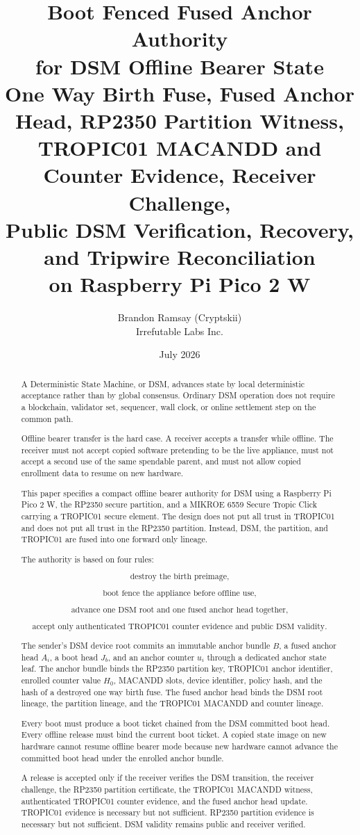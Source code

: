 \documentclass[11pt]{article}
\title{\textbf{Boot Fenced Fused Anchor Authority\\
for DSM Offline Bearer State}\\[4pt]
\large One Way Birth Fuse, Fused Anchor Head, RP2350 Partition Witness,\\
TROPIC01 MACANDD and Counter Evidence, Receiver Challenge,\\
Public DSM Verification, Recovery, and Tripwire Reconciliation\\
on Raspberry Pi Pico 2 W}
\author{Brandon Ramsay (Cryptskii)\\\small Irrefutable Labs Inc.}
\date{July 2026}
\theoremstyle{definition}
\theoremstyle{remark}
\newcommand{\Bundle}{\ensuremath{B}}
\newcommand{\Ahead}{\ensuremath{A}}
\newcommand{\Bhead}{\ensuremath{J}}
\begin{document}
\maketitle

\begin{abstract}
A Deterministic State Machine, or DSM, advances state by local deterministic acceptance rather
than by global consensus. Ordinary DSM operation does not require a blockchain, validator set,
sequencer, wall clock, or online settlement step on the common path.

Offline bearer transfer is the hard case. A receiver accepts a transfer while offline. The receiver
must not accept copied software pretending to be the live appliance, must not accept a second use
of the same spendable parent, and must not allow copied enrollment data to resume on new hardware.

This paper specifies a compact offline bearer authority for DSM using a Raspberry Pi Pico 2 W,
the RP2350 secure partition, and a MIKROE 6559 Secure Tropic Click carrying a TROPIC01 secure
element. The design does not put all trust in TROPIC01 and does not put all trust in the RP2350
partition. Instead, DSM, the partition, and TROPIC01 are fused into one forward only lineage.

The authority is based on four rules:

\[
\text{destroy the birth preimage,}
\]

\[
\text{boot fence the appliance before offline use,}
\]

\[
\text{advance one DSM root and one fused anchor head together,}
\]

\[
\text{accept only authenticated TROPIC01 counter evidence and public DSM validity.}
\]

The sender's DSM device root commits an immutable anchor bundle \(\Bundle\), a fused anchor head
\(\Ahead_i\), a boot head \(\Bhead_b\), and an anchor counter \(u_i\) through a dedicated anchor
state leaf. The anchor bundle binds the RP2350
partition key, TROPIC01 anchor identifier, enrolled counter value \(H_0\), MACANDD slots, device
identifier, policy hash, and the hash of a destroyed one way birth fuse. The fused anchor head
binds the DSM root lineage, the partition lineage, and the TROPIC01 MACANDD and counter lineage.

Every boot must produce a boot ticket chained from the DSM committed boot head. Every offline
release must bind the current boot ticket. A copied state image on new hardware cannot resume
offline bearer mode because new hardware cannot advance the committed boot head under the enrolled
anchor bundle.

A release is accepted only if the receiver verifies the DSM transition, the receiver challenge,
the RP2350 partition certificate, the TROPIC01 MACANDD witness, authenticated TROPIC01 counter
evidence, and the fused anchor head update. TROPIC01 evidence is necessary but not sufficient.
RP2350 partition evidence is necessary but not sufficient. DSM validity remains public and
receiver verified.
\end{abstract}
\end{document}
